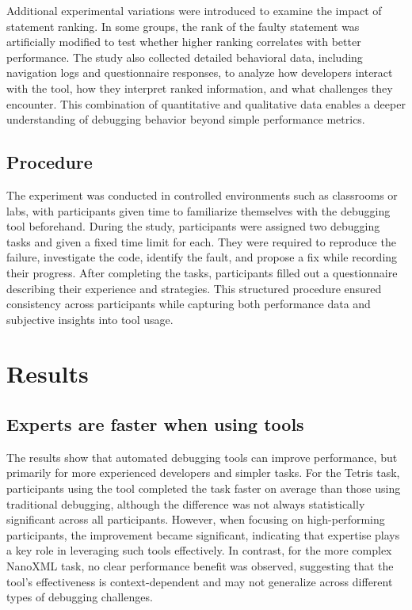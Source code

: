 Additional experimental variations were introduced to examine the impact of statement ranking. In some groups, the rank of the faulty statement was artificially modified to test whether higher ranking correlates with better performance. The study also collected detailed behavioral data, including navigation logs and questionnaire responses, to analyze how developers interact with the tool, how they interpret ranked information, and what challenges they encounter. This combination of quantitative and qualitative data enables a deeper understanding of debugging behavior beyond simple performance metrics.

\subsection{Procedure}
The experiment was conducted in controlled environments such as classrooms or labs, with participants given time to familiarize themselves with the debugging tool beforehand. During the study, participants were assigned two debugging tasks and given a fixed time limit for each. They were required to reproduce the failure, investigate the code, identify the fault, and propose a fix while recording their progress. After completing the tasks, participants filled out a questionnaire describing their experience and strategies. This structured procedure ensured consistency across participants while capturing both performance data and subjective insights into tool usage.

\section{Results}
\subsection{Experts are faster when using tools}

The results show that automated debugging tools can improve performance, but primarily for more experienced developers and simpler tasks. For the Tetris task, participants using the tool completed the task faster on average than those using traditional debugging, although the difference was not always statistically significant across all participants. However, when focusing on high-performing participants, the improvement became significant, indicating that expertise plays a key role in leveraging such tools effectively. In contrast, for the more complex NanoXML task, no clear performance benefit was observed, suggesting that the tool’s effectiveness is context-dependent and may not generalize across different types of debugging challenges.

